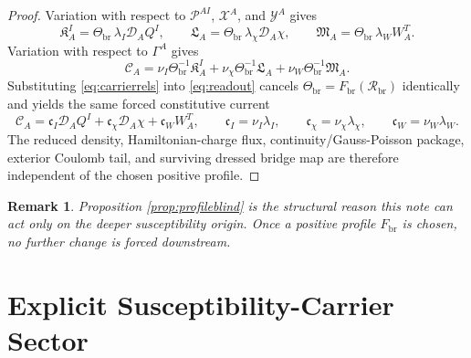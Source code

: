 \documentclass[11pt]{article}
\newcommand{\SpatialD}{\mathcal D}
\newcommand{\ConstCurrent}{\mathcal C}
\newcommand{\ConstGamma}{\Gamma}
\newcommand{\CurvQMult}{\mathscr P}
\newcommand{\CurvChiMult}{\mathscr X}
\newcommand{\CurvTransMult}{\mathscr Y}
\newcommand{\CurvSeed}{\Theta_{\mathrm{br}}}
\newcommand{\CurvProfile}{F_{\mathrm{br}}}
\newcommand{\CurvOneI}{\mathfrak K}
\newcommand{\CurvOneChi}{\mathfrak L}
\newcommand{\CurvOneW}{\mathfrak M}
\newcommand{\BridgeCurv}{\mathcal R_{\mathrm{br}}}
\newtheorem{remark}{Remark}
\begin{document}
\begin{proof}
Variation with respect to \(\CurvQMult^{AI}\), \(\CurvChiMult^A\), and \(\CurvTransMult^A\) gives
\begin{equation}
\CurvOneI_A^I=\CurvSeed\,\lambda_I\SpatialD_AQ^I,
\qquad
\CurvOneChi_A=\CurvSeed\,\lambda_\chi\SpatialD_A\chi,
\qquad
\CurvOneW_A=\CurvSeed\,\lambda_WW_A^T.
\label{eq:carrierrels}
\end{equation}
Variation with respect to \(\ConstGamma^A\) gives
\begin{equation}
\ConstCurrent_A
=
\nu_I\CurvSeed^{-1}\CurvOneI_A^I
+\nu_\chi\CurvSeed^{-1}\CurvOneChi_A
+\nu_W\CurvSeed^{-1}\CurvOneW_A.
\label{eq:readout}
\end{equation}
Substituting \eqref{eq:carrierrels} into \eqref{eq:readout} cancels \(\CurvSeed=\CurvProfile(\BridgeCurv)\) identically and yields the same forced constitutive current
\begin{equation}
\ConstCurrent_A
=
\mathfrak c_I\SpatialD_AQ^I
+\mathfrak c_\chi\SpatialD_A\chi
+\mathfrak c_WW_A^T,
\qquad
\mathfrak c_I=\nu_I\lambda_I,
\qquad
\mathfrak c_\chi=\nu_\chi\lambda_\chi,
\qquad
\mathfrak c_W=\nu_W\lambda_W.
\label{eq:forcedcurrent}
\end{equation}
The reduced density, Hamiltonian-charge flux, continuity/Gauss-Poisson package, exterior Coulomb tail, and surviving dressed bridge map are therefore independent of the chosen positive profile.
\end{proof}

\begin{remark}
Proposition \ref{prop:profileblind} is the structural reason this note can act only on the deeper susceptibility origin. Once a positive profile \(\CurvProfile\) is chosen, no further change is forced downstream.
\end{remark}

\section{Explicit Susceptibility-Carrier Sector}
\end{document}
